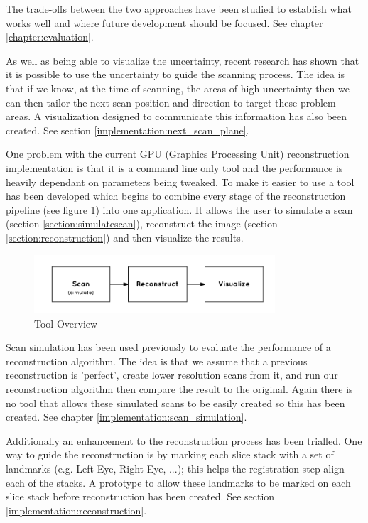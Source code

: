 The trade-offs between the two approaches have been studied to establish what works well and where future development should be focused. See chapter \ref{chapter:evaluation}.

As well as being able to visualize the uncertainty, recent research\cite{uncertaintysvd} has shown that it is possible to use the uncertainty to guide the scanning process. The idea is that if we know, at the time of scanning, the areas of high uncertainty then we can then tailor the next scan position and direction to target these problem areas. A visualization designed to communicate this information has also been created. See section \ref{implementation:next_scan_plane}.

One problem with the current GPU (Graphics Processing Unit) reconstruction implementation\cite{gpureconstruction} is that it is a command line only tool and the performance is heavily dependant on parameters being tweaked. To make it easier to use a tool has been developed which begins to combine every stage of the reconstruction pipeline (see figure \ref{fig:tool_overview}) into one application. It allows the user to simulate a scan (section \ref{section:simulatescan}), reconstruct the image (section \ref{section:reconstruction}) and then visualize the results.

\begin{figure}[h]
    \centering
  \includegraphics[width=0.8\textwidth]{images/tool_overview.png}
    \caption{Tool Overview}\label{fig:tool_overview}
\end{figure}

Scan simulation has been used previously to evaluate the performance of a reconstruction algorithm\cite{uncertaintysvd}. The idea is that we  assume that a previous reconstruction is 'perfect', create lower resolution scans from it, and run our reconstruction algorithm then compare the result to the original. Again there is no tool that allows these simulated scans to be easily created so this has been created. See chapter \ref{implementation:scan_simulation}.

Additionally an enhancement to the reconstruction process has been trialled. One way to guide the reconstruction is by marking each slice stack with a set of landmarks (e.g. Left Eye, Right Eye, ...); this helps the registration step align each of the stacks. A prototype to allow these landmarks to be marked on each slice stack before reconstruction has been created. See section \ref{implementation:reconstruction}.